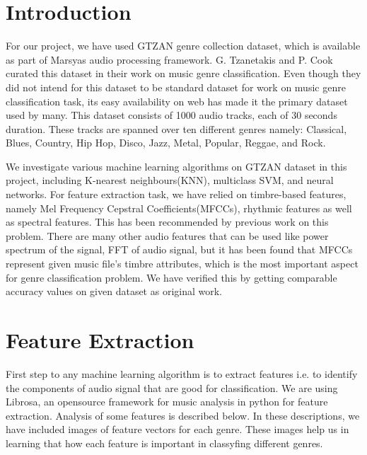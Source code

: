 \documentclass[conference]{IEEEtran}
\begin{document}
\section{Introduction}
For our project, we have used GTZAN genre collection dataset, which is available as part of Marsyas audio processing framework. G. Tzanetakis and P. Cook curated this dataset in their work\cite{gtzan} on music genre classification. Even though they did not intend for this dataset to be standard dataset for work on music genre classification task\cite{bob}, its easy availability on web has made it the primary dataset used by many\cite{michael}\cite{bob}\cite{base}. This dataset consists of 1000 audio tracks, each of 30 seconds duration. These tracks are spanned over ten different genres namely: Classical, Blues, Country, Hip Hop, Disco, Jazz, Metal, Popular, Reggae, and Rock.\par
We investigate various machine learning algorithms on GTZAN dataset in this project, including K-nearest neighbours(KNN), multiclass SVM, and neural networks. For feature extraction task, we have relied on timbre-based features, namely Mel Frequency Cepstral Coefficients(MFCCs), rhythmic features as well as spectral features. This has been recommended by previous work on this problem\cite{zu}. There are many other audio features that can be used like power spectrum of the signal, FFT of audio signal, but it has been found that MFCCs represent given music file's timbre attributes, which is the most important aspect for genre classification problem. We have verified this by getting comparable accuracy values on given dataset as original work\cite{gtzan}.


\section{Feature Extraction}
First step to any machine learning algorithm is to extract features i.e. to identify the components of audio signal that are good for classification. We are using Librosa, an opensource framework for music analysis in python for feature extraction.
Analysis of some features is described below. In these descriptions, we have included images of feature vectors for each genre. These images help us in learning that how each feature is important in classyfing different genres.
\end{document}
